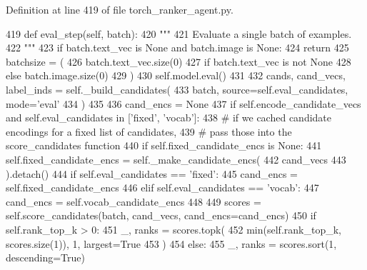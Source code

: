 Definition at line 419 of file torch\+\_\+ranker\+\_\+agent.\+py.


\begin{DoxyCode}
419     \textcolor{keyword}{def }eval\_step(self, batch):
420         \textcolor{stringliteral}{"""}
421 \textcolor{stringliteral}{        Evaluate a single batch of examples.}
422 \textcolor{stringliteral}{        """}
423         \textcolor{keywordflow}{if} batch.text\_vec \textcolor{keywordflow}{is} \textcolor{keywordtype}{None} \textcolor{keywordflow}{and} batch.image \textcolor{keywordflow}{is} \textcolor{keywordtype}{None}:
424             \textcolor{keywordflow}{return}
425         batchsize = (
426             batch.text\_vec.size(0)
427             \textcolor{keywordflow}{if} batch.text\_vec \textcolor{keywordflow}{is} \textcolor{keywordflow}{not} \textcolor{keywordtype}{None}
428             \textcolor{keywordflow}{else} batch.image.size(0)
429         )
430         self.model.eval()
431 
432         cands, cand\_vecs, label\_inds = self.\_build\_candidates(
433             batch, source=self.eval\_candidates, mode=\textcolor{stringliteral}{'eval'}
434         )
435 
436         cand\_encs = \textcolor{keywordtype}{None}
437         \textcolor{keywordflow}{if} self.encode\_candidate\_vecs \textcolor{keywordflow}{and} self.eval\_candidates \textcolor{keywordflow}{in} [\textcolor{stringliteral}{'fixed'}, \textcolor{stringliteral}{'vocab'}]:
438             \textcolor{comment}{# if we cached candidate encodings for a fixed list of candidates,}
439             \textcolor{comment}{# pass those into the score\_candidates function}
440             \textcolor{keywordflow}{if} self.fixed\_candidate\_encs \textcolor{keywordflow}{is} \textcolor{keywordtype}{None}:
441                 self.fixed\_candidate\_encs = self.\_make\_candidate\_encs(
442                     cand\_vecs
443                 ).detach()
444             \textcolor{keywordflow}{if} self.eval\_candidates == \textcolor{stringliteral}{'fixed'}:
445                 cand\_encs = self.fixed\_candidate\_encs
446             \textcolor{keywordflow}{elif} self.eval\_candidates == \textcolor{stringliteral}{'vocab'}:
447                 cand\_encs = self.vocab\_candidate\_encs
448 
449         scores = self.score\_candidates(batch, cand\_vecs, cand\_encs=cand\_encs)
450         \textcolor{keywordflow}{if} self.rank\_top\_k > 0:
451             \_, ranks = scores.topk(
452                 min(self.rank\_top\_k, scores.size(1)), 1, largest=\textcolor{keyword}{True}
453             )
454         \textcolor{keywordflow}{else}:
455             \_, ranks = scores.sort(1, descending=\textcolor{keyword}{True})

\end{DoxyCode}

